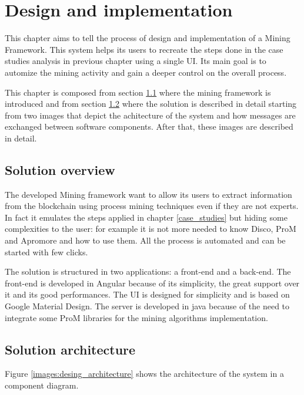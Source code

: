 \chapter{Design and implementation}
\label{design_implementation}

This chapter aims to tell the process of design and implementation of a Mining Framework. This system helps its users to 
recreate the steps done in the case studies analysis in previous chapter using a single UI. Its main goal is to automize the 
mining activity and gain a deeper control on the overall process.

This chapter is composed from section \ref{desing:overview} where the mining framework is introduced and from section 
\ref{desing:architecture} where the solution is described in detail starting from two images that depict the achitecture of the 
system and how messages are exchanged between software components. After that, these images are described in detail.


\section{Solution overview}
\label{desing:overview}
The developed Mining framework want to allow its users to extract information from the blockchain using process mining techniques 
even if they are not experts. In fact it emulates the steps applied in chapter \ref{case_studies} but hiding some complexities to 
the user: for example it is not more needed to know Disco, ProM and Apromore and how to use them. All the process is automated 
and can be started with few clicks. 

The solution is structured in two applications: a front-end and a back-end. The front-end is developed in Angular because of its 
simplicity, the great support over it and its good performances. The UI is designed for simplicity and is based on Google Material 
Design. The server is developed in java because of the need to integrate some ProM libraries for the mining algorithms 
implementation.


\section{Solution architecture}
\label{desing:architecture}

Figure \ref{images:desing_architecture} shows the architecture of the system in a component diagram.

